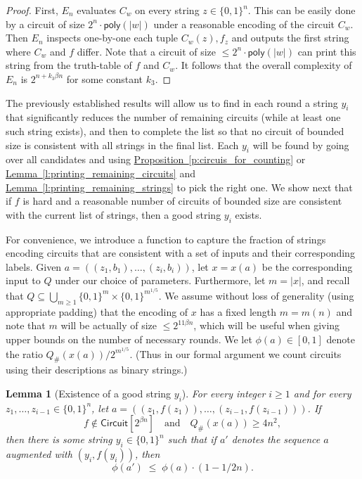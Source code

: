 \documentclass[11pt]{article}
\numberwithin{equation}{section}
\newtheorem{lemma}[theorem]{Lemma}
\theoremstyle{definition}
\theoremstyle{plain}
\newcommand{\expref}[2]{\hyperref[#2]{#1~\ref{#2}}}
\begin{document}
\begin{proof}
First, $E_n$ evaluates $C_w$ on every string $z \in \{0,1\}^n$. This can be easily done by a circuit of size $2^n \cdot \mathsf{poly}(|w|)$ under a reasonable encoding of the circuit $C_w$. Then $E_n$ inspects one-by-one each tuple $C_w(z), f_z$ and outputs the first string where $C_w$ and $f$ differ. Note that a circuit of size $\leq 2^n \cdot \mathsf{poly}(|w|)$ can print this string from the truth-table of $f$ and $C_w$. It follows that the overall complexity of $E_n$ is $2^{n + k_3 \beta n}$ for some constant $k_3$. 
\end{proof}

The previously established results will allow us to find in each round a string $y_i$ that significantly reduces the number of remaining circuits (while at least one such string exists), and then to complete the list so that no circuit of bounded size is consistent with all strings in the final list. Each $y_i$ will be found by going over all candidates and using \expref{Proposition}{p:circuis_for_counting} or \expref{Lemma}{l:printing_remaining_circuits} and \expref{Lemma}{l:printing_remaining_strings} to pick the right one. We show next that if $f$ is hard and a reasonable number of circuits of bounded size are consistent with the current list of strings, then a good string $y_i$ exists.

For convenience, we introduce a function to capture the fraction of strings encoding circuits that are consistent with a set of inputs and their corresponding labels. Given $a = ((z_1, b_1), \ldots, (z_i, b_i))$, let $x = x(a)$ be the corresponding input to $Q$ under our choice of parameters. Furthermore, let $m = |x|$, and recall that $Q \subseteq \bigcup_{m \geq 1} \{0,1\}^m \times \{0,1\}^{m^{1/5}}$. 
We assume without loss of generality (using appropriate padding) that the encoding of $x$ has a fixed length $m = m(n)$ and note that $m$ will be actually of size $\le 2^{11 \beta n}$, which will be useful when
%
giving upper bounds on %
the number of necessary rounds.  We let $\phi(a) \in [0,1]$ denote the ratio $Q_{\#}(x(a))/2^{m^{1/5}}$. (Thus in our formal argument we count circuits using their descriptions as binary strings.)

\begin{lemma}[Existence of a good string $y_i$]\label{l:existence_string}
For every integer $i \geq 1$ and for every $z_1, \ldots, z_{i - 1} \in \{0,1\}^n$, let $a = ((z_1, f(z_1)), \ldots, (z_{i-1},f(z_{i-1})))$. If $$f \notin \mathsf{Circuit}[2^{\beta n}] \quad \text{and} \quad Q_{\#}(x(a)) \geq 4n^2,$$ then there is some string $y_i \in \{0,1\}^n$ such that if $a'$ denotes the sequence $a$ augmented with $(y_i, f(y_i))$, then $$\phi(a') \;\leq\; \phi(a) \cdot (1 - 1/2n).$$
\end{lemma}
\end{document}
